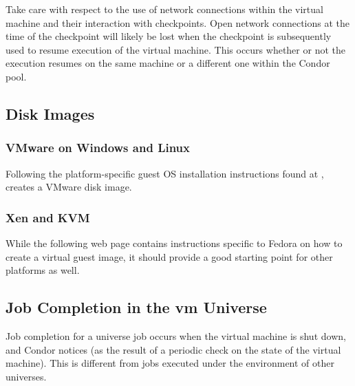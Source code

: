 Take care with respect to the use of network connections within
the virtual machine and their interaction with checkpoints.
Open network connections at the time of the checkpoint will likely
be lost when the checkpoint is subsequently used to resume execution
of the virtual machine.
This occurs whether or not the execution resumes
on the same machine or a different one within the Condor pool.   

\subsection{\label{sec:vm-disk-image-details}Disk Images}

\subsubsection{\label{sec:vm-disk-image-details-vmware}
VMware on Windows and Linux}



Following the platform-specific
guest OS installation instructions found at
,
creates a VMware disk image.

\subsubsection{\label{sec:vm-disk-image-details-xen}Xen and KVM}
While the following web page contains instructions specific to
Fedora on how to create a virtual guest image,
it should provide a good starting point for 
other platforms as well.


\subsection{\label{sec:vm-job-completion-details}Job Completion in the vm Universe}

Job completion for a  universe job occurs when 
the virtual machine is shut down, and Condor notices 
(as the result of a periodic check on the state of the virtual machine).
This is different from jobs executed under the environment of other 
universes.


